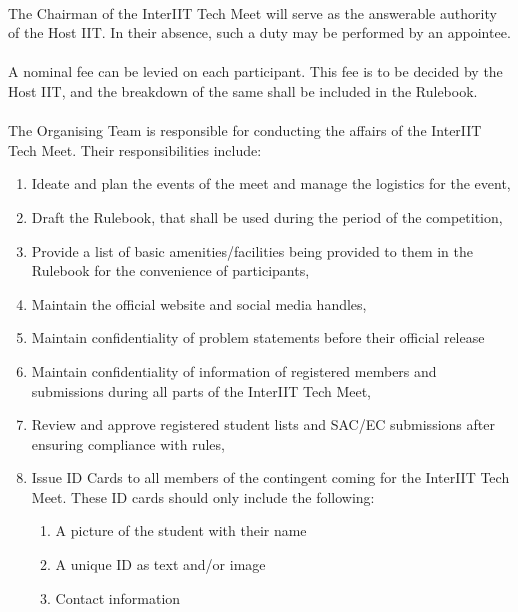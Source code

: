 \paragraph{}
The Chairman of the InterIIT Tech Meet will serve as the answerable authority of the Host IIT. In their absence, such a duty may be performed by an appointee.

\paragraph{}
A nominal fee can be levied on each participant. This fee is to be decided by the Host IIT, and the breakdown of the same shall be included in the Rulebook. 

\paragraph{}
The Organising Team is responsible for conducting the affairs of the InterIIT Tech Meet. Their responsibilities include:
\begin{enumerate}
    \item Ideate and plan the events of the meet and manage the logistics for the event,
    \item Draft the Rulebook, that shall be used during the period of the competition,
    \item Provide a list of basic amenities/facilities being provided to them in the Rulebook for the convenience of participants,
    \item Maintain the official website and social media handles,
    \item Maintain confidentiality of problem statements before their official release
    \item Maintain confidentiality of information of registered members and submissions during all parts of the InterIIT Tech Meet,
    \item Review and approve registered student lists and SAC/EC submissions after ensuring compliance with rules,
    \item Issue ID Cards to all members of the contingent coming for the InterIIT Tech Meet. These ID cards should only include the following:
    \begin{enumerate}
        \item A picture of the student with their name
        \item A unique ID as text and/or image
        \item Contact information
    \end{enumerate}
\end{enumerate}

